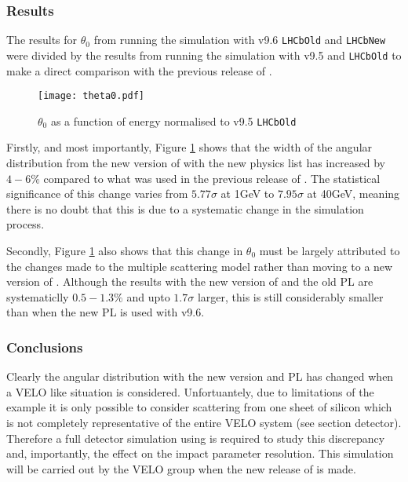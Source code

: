 \subsubsection{Results}
\label{sec:MscResults}
The results for $\theta_0$ from running the simulation with v9.6 \texttt{LHCbOld} and \texttt{LHCbNew} were divided by the results from running the simulation with v9.5 and \texttt{LHCbOld} to make a direct comparison with the previous release of \geant.
\begin{figure}[h]
  \centering
  \texttt{[image: theta0.pdf]}
  \caption{$\theta_0$ as a function of energy normalised to \geant v9.5 \texttt{LHCbOld}}
  \label{fig:theta0}
\end{figure}

Firstly, and most importantly, Figure \ref{fig:theta0} shows that the width of the angular distribution from the new version of \geant with the new physics list has increased by $4-6\%$ compared to what was used in the previous release of \geant.  The statistical significance of this change varies from $5.77\sigma$ at 1GeV to $7.95\sigma$ at 40GeV, meaning there is no doubt that this is due to a systematic change in the simulation process.

Secondly, Figure \ref{fig:theta0} also shows that this change in $\theta_0$ must be largely attributed to the changes made to the multiple scattering model rather than moving to a new version of \geant.  Although the results with the new version of \geant and the old PL are systematiclly $0.5-1.3\%$ and upto $1.7\sigma$ larger, this is still considerably smaller than when the new PL is used with v9.6.

\subsubsection{Conclusions}
\label{sec:Conclusions}
Clearly the angular distribution with the new \geant version and PL has changed when a \lhcb VELO like situation is considered.  Unfortuantely, due to limitations of the \geant example it is only possible to consider scattering from one sheet of silicon which is not completely representative of the entire VELO system (see section detector).  Therefore a full detector simulation using \gauss is required to study this discrepancy and, importantly, the effect on the impact parameter resolution.  This simulation will be carried out by the \lhcb VELO group when the new release of \gauss is made.

\clearpage

